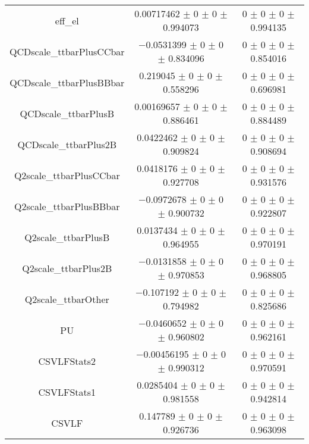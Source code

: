 \begin{table}
\begin{tabular}{ccc}
eff\_el & \num{0.00717462} $\pm$ \num{0} $\pm$ \num{0} $\pm$ \num{0.994073} & \num{0} $\pm$ \num{0} $\pm$ \num{0} $\pm$ \num{0.994135}\\
QCDscale\_ttbarPlusCCbar & \num{-0.0531399} $\pm$ \num{0} $\pm$ \num{0} $\pm$ \num{0.834096} & \num{0} $\pm$ \num{0} $\pm$ \num{0} $\pm$ \num{0.854016}\\
QCDscale\_ttbarPlusBBbar & \num{0.219045} $\pm$ \num{0} $\pm$ \num{0} $\pm$ \num{0.558296} & \num{0} $\pm$ \num{0} $\pm$ \num{0} $\pm$ \num{0.696981}\\
QCDscale\_ttbarPlusB & \num{0.00169657} $\pm$ \num{0} $\pm$ \num{0} $\pm$ \num{0.886461} & \num{0} $\pm$ \num{0} $\pm$ \num{0} $\pm$ \num{0.884489}\\
QCDscale\_ttbarPlus2B & \num{0.0422462} $\pm$ \num{0} $\pm$ \num{0} $\pm$ \num{0.909824} & \num{0} $\pm$ \num{0} $\pm$ \num{0} $\pm$ \num{0.908694}\\
Q2scale\_ttbarPlusCCbar & \num{0.0418176} $\pm$ \num{0} $\pm$ \num{0} $\pm$ \num{0.927708} & \num{0} $\pm$ \num{0} $\pm$ \num{0} $\pm$ \num{0.931576}\\
Q2scale\_ttbarPlusBBbar & \num{-0.0972678} $\pm$ \num{0} $\pm$ \num{0} $\pm$ \num{0.900732} & \num{0} $\pm$ \num{0} $\pm$ \num{0} $\pm$ \num{0.922807}\\
Q2scale\_ttbarPlusB & \num{0.0137434} $\pm$ \num{0} $\pm$ \num{0} $\pm$ \num{0.964955} & \num{0} $\pm$ \num{0} $\pm$ \num{0} $\pm$ \num{0.970191}\\
Q2scale\_ttbarPlus2B & \num{-0.0131858} $\pm$ \num{0} $\pm$ \num{0} $\pm$ \num{0.970853} & \num{0} $\pm$ \num{0} $\pm$ \num{0} $\pm$ \num{0.968805}\\
Q2scale\_ttbarOther & \num{-0.107192} $\pm$ \num{0} $\pm$ \num{0} $\pm$ \num{0.794982} & \num{0} $\pm$ \num{0} $\pm$ \num{0} $\pm$ \num{0.825686}\\
PU & \num{-0.0460652} $\pm$ \num{0} $\pm$ \num{0} $\pm$ \num{0.960802} & \num{0} $\pm$ \num{0} $\pm$ \num{0} $\pm$ \num{0.962161}\\
CSVLFStats2 & \num{-0.00456195} $\pm$ \num{0} $\pm$ \num{0} $\pm$ \num{0.990312} & \num{0} $\pm$ \num{0} $\pm$ \num{0} $\pm$ \num{0.970591}\\
CSVLFStats1 & \num{0.0285404} $\pm$ \num{0} $\pm$ \num{0} $\pm$ \num{0.981558} & \num{0} $\pm$ \num{0} $\pm$ \num{0} $\pm$ \num{0.942814}\\
CSVLF & \num{0.147789} $\pm$ \num{0} $\pm$ \num{0} $\pm$ \num{0.926736} & \num{0} $\pm$ \num{0} $\pm$ \num{0} $\pm$ \num{0.963098}\\

\end{tabular}
\end{table}
